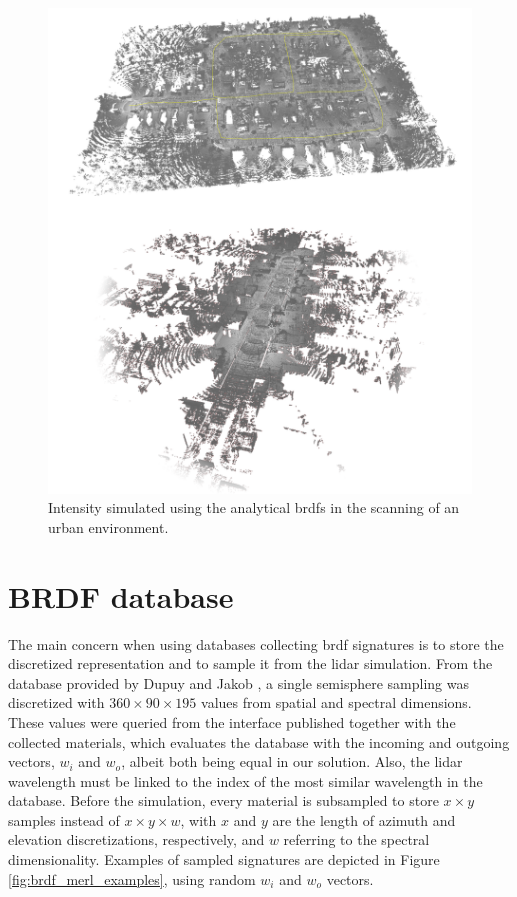 \begin{figure}[ht]
    \centering
    \includegraphics[width=\linewidth]{figs/lidar_intensity/analytical_brdf_intensity_result.png}
    \caption{Intensity simulated using the analytical \acrshort{brdf}s in the scanning of an urban environment. }
	\label{fig:lidar_analytical_brdfs_intensity_result}
\end{figure}

\section{BRDF database}

The main concern when using databases collecting \acrshort{brdf} signatures is to store the discretized representation and to sample it from the \acrshort{lidar} simulation. From the database provided by Dupuy and Jakob \cite{dupuy_adaptive_2018}, a single semisphere sampling was discretized with $360 \times 90 \times 195$ values from spatial and spectral dimensions. These values were queried from the interface published together with the collected materials, which evaluates the database with the incoming and outgoing vectors, $w_i$ and $w_o$, albeit both being equal in our solution. Also, the \acrshort{lidar} wavelength must be linked to the index of the most similar wavelength in the database. Before the simulation, every material is subsampled to store $x \times y$ samples instead of $x \times y \times w$, with $x$ and $y$ are the length of azimuth and elevation discretizations, respectively, and $w$ referring to the spectral dimensionality. Examples of sampled signatures are depicted in Figure \ref{fig:brdf_merl_examples}, using random $w_i$ and $w_o$ vectors.

